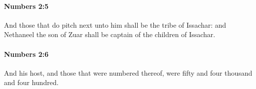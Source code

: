 		\paragraph{Numbers 2:5} %
			\label{NUMBERS-2-5}

			And those that do pitch next unto him shall be the tribe of Issachar: and Nethaneel the son of Zuar shall be captain of the children of Issachar.


		\paragraph{Numbers 2:6} %
			\label{NUMBERS-2-6}

			And his host, and those that were numbered thereof, were fifty and four thousand and four hundred.


